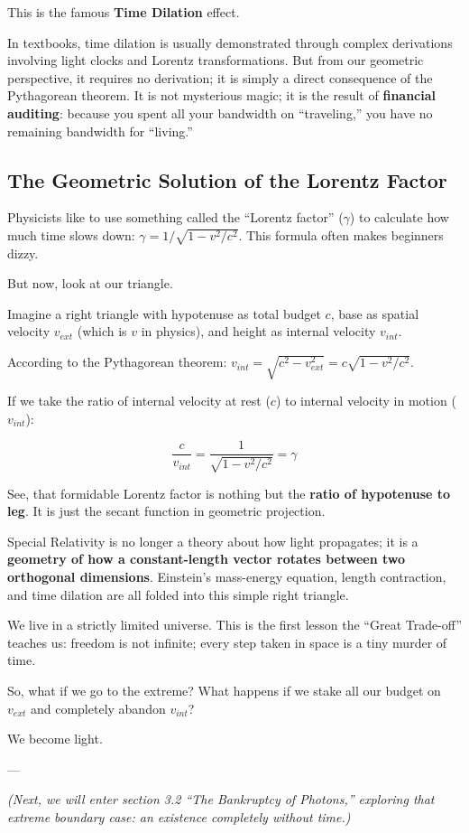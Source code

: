This is the famous \textbf{Time Dilation} effect.

In textbooks, time dilation is usually demonstrated through complex derivations involving light clocks and Lorentz transformations. But from our geometric perspective, it requires no derivation; it is simply a direct consequence of the Pythagorean theorem. It is not mysterious magic; it is the result of \textbf{financial auditing}: because you spent all your bandwidth on ``traveling,'' you have no remaining bandwidth for ``living.''

\subsection{The Geometric Solution of the Lorentz Factor}

Physicists like to use something called the ``Lorentz factor'' ($\gamma$) to calculate how much time slows down: $\gamma = 1/\sqrt{1-v^2/c^2}$. This formula often makes beginners dizzy.

But now, look at our triangle.

Imagine a right triangle with hypotenuse as total budget $c$, base as spatial velocity $v_{ext}$ (which is $v$ in physics), and height as internal velocity $v_{int}$.

According to the Pythagorean theorem: $v_{int} = \sqrt{c^2 - v_{ext}^2} = c \sqrt{1 - v^2/c^2}$.

If we take the ratio of internal velocity at rest ($c$) to internal velocity in motion ($v_{int}$):

$$\frac{c}{v_{int}} = \frac{1}{\sqrt{1-v^2/c^2}} = \gamma$$

See, that formidable Lorentz factor is nothing but the \textbf{ratio of hypotenuse to leg}. It is just the secant function in geometric projection.

Special Relativity is no longer a theory about how light propagates; it is a \textbf{geometry of how a constant-length vector rotates between two orthogonal dimensions}. Einstein's mass-energy equation, length contraction, and time dilation are all folded into this simple right triangle.

We live in a strictly limited universe. This is the first lesson the ``Great Trade-off'' teaches us: freedom is not infinite; every step taken in space is a tiny murder of time.

So, what if we go to the extreme? What happens if we stake all our budget on $v_{ext}$ and completely abandon $v_{int}$?

We become light.

---

\textit{(Next, we will enter section 3.2 ``The Bankruptcy of Photons,'' exploring that extreme boundary case: an existence completely without time.)}

